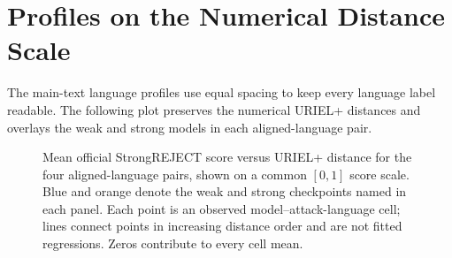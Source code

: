 \section{Profiles on the Numerical Distance Scale}
The main-text language profiles use equal spacing to keep every language label readable. The following plot preserves the numerical URIEL+ distances and overlays the weak and strong models in each aligned-language pair.

\begin{figure}[p]\centering
\caption[StrongREJECT scores and linguistic distance]{Mean official StrongREJECT score versus URIEL+ distance for the four aligned-language pairs, shown on a common $[0,1]$ score scale. Blue and orange denote the weak and strong checkpoints named in each panel. Each point is an observed model--attack-language cell; lines connect points in increasing distance order and are not fitted regressions. Zeros contribute to every cell mean.}

\resizebox{\linewidth}{!}{}
\label{fig:graded-distance}
\end{figure}

